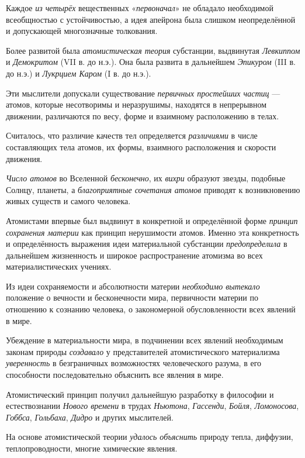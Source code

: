 \documentclass[a4paper,14pt,russian]{extreport}
\begin{document}
Каждое \emph{из четырёх} вещественных «\emph{первоначал}» не обладало необходимой всеобщностью с устойчивостью, а идея апейрона была слишком неопределённой и допускающей многозначные толкования.

Более развитой была \emph{атомистическая теория} субстанции, выдвинутая \emph{Левкиппом} и \emph{Демокритом} (VII в. до н.э.). Она была развита в дальнейшем \emph{Эпикуром} (III в. до н.э.) и \emph{Лукрцием Каром} (I в. до н.э.).

Эти мыслители допускали существование \emph{первичных простейших частиц} --- атомов, которые несотворимы и неразрушимы, находятся в непрерывном движении, различаются по весу, форме и взаимному расположению в телах.

Считалось, что различие качеств тел определяется \emph{различиями} в числе составляющих тела атомов, их формы, взаимного расположения и скорости движения.

\emph{Число атомов} во Вселенной \emph{бесконечно}, их \emph{вихри} образуют звезды, подобные Солнцу, планеты, а \emph{благоприятные сочетания атомов} приводят к возникновению живых существ и самого человека.

Атомистами впервые был выдвинут в конкретной и определённой форме \emph{принцип сохранения материи} как принцип нерушимости атомов. Именно эта конкретность и определённость выражения идеи материальной субстанции \emph{предопределила} в дальнейшем жизненность и широкое распространение атомизма во всех материалистических учениях.

Из идеи сохраняемости и абсолютности материи \emph{необходимо вытекало} положение о вечности и бесконечности мира, первичности материи по отношению к сознанию человека, о закономерной обусловленности всех явлений в мире.

Убеждение в материальности мира, в подчинении всех явлений необходимым законам природы \emph{создавало} у представителей атомистического материализма \emph{уверенность} в безграничных возможностях человеческого разума, в его способности последовательно объяснить все явления в мире.

Атомистический принцип получил дальнейшую разработку в философии и естествознании \emph{Нового времени} в трудах \emph{Ньютона}, \emph{Гассенди}, \emph{Бойля}, \emph{Ломоносова}, \emph{Гоббса}, \emph{Гольбаха}, \emph{Дидро} и других мыслителей.

На основе атомистической теории \emph{удалось объяснить} природу тепла, диффузии, теплопроводности, многие химические явления.
\end{document}
